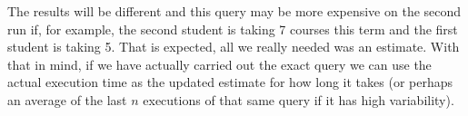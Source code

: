 The results will be different and this query may be more expensive on the second run if, for example, the second student is taking 7 courses this term and the first student is taking 5. That is expected, all we really needed was an estimate. With that in mind, if we have actually carried out the exact query we can use the actual execution time as the updated estimate for how long it takes (or perhaps an average of the last $n$ executions of that same query if it has high variability). 




